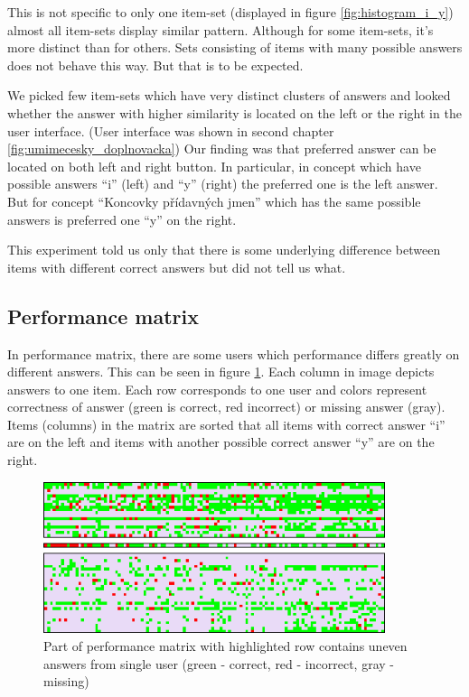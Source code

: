\documentclass[
  digital, %
  table,   %
  nolof,     %
  nolot,     %
  nocover,
  color,
  final, %
]{fithesis3}
\begin{document}


This is not specific to only one item-set (displayed in figure \ref{fig:histogram_i_y}) almost all item-sets display similar pattern. Although for some item-sets, it's more distinct than for others. Sets consisting of items with many possible answers does not behave this way. But that is to be expected.

We picked few item-sets which have very distinct clusters of answers and looked whether the answer with higher similarity is located on the left or the right in the user interface. (User interface was shown in second chapter \ref{fig:umimecesky_doplnovacka}) Our finding was that preferred answer can be located on both left and right button. In particular, in concept \cviceniB{} which have possible answers ``i'' (left) and ``y'' (right) the preferred one is the left answer. But for concept ``Koncovky přídavných jmen'' which has the same possible answers is preferred one ``y'' on the right.

This experiment told us only that there is some underlying difference between items with different correct answers but did not tell us what.


\subsection{Performance matrix}\label{performance-matrix}

In performance matrix, there are some users which performance differs greatly on different answers. This can be seen in figure \ref{fig:performance_matrix}. Each column in image depicts answers to one item. Each row corresponds to one user and colors represent correctness of answer (green is correct, red incorrect) or missing answer (gray). Items (columns) in the matrix are sorted that all items with correct answer ``i'' are on the left and items with another possible correct answer ``y'' are on the right.

\begin{figure}
  \includegraphics[width=10cm]{img/performance_matrix}
  \caption{Part of performance matrix with highlighted row contains uneven answers from single user (green - correct, red - incorrect, gray - missing)}
  \label{fig:performance_matrix}
\end{figure}
\end{document}
